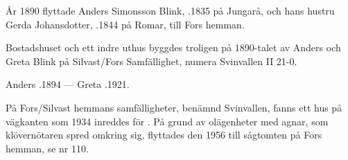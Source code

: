 %
År 1890 flyttade Anders Simonsson Blink, .1835 på Jungarå, och hans hustru Gerda Johansdotter, .1844 på Romar, till Fors hemman.
\begin{jhchildren}
  \item {}
  \item {}
  \item {}
  \item {}
\end{jhchildren}
Bostadshuset och ett indre uthus byggdes troligen på 1890-talet av Anders och Greta Blink på Silvast/Fors Samfällighet, numera Svinvallen	II 21-0.

Anders .1894  ---  Greta .1921.


%
På Fors/Silvast hemmans samfälligheter, benämnd Svinvallen, fanns ett hus på vägkanten som 1934 inreddes för . På grund av olägenheter med agnar, som klövernötaren spred omkring sig, flyttades den 1956 till sågtomten på Fors hemman, se nr 110.
